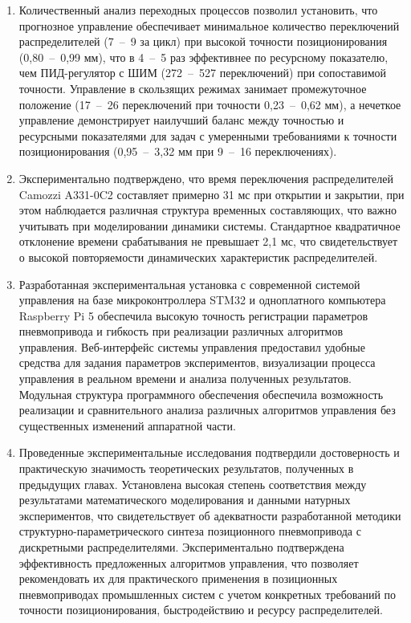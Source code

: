 \begin{enumerate}
\item Количественный анализ переходных процессов позволил установить, что прогнозное управление обеспечивает минимальное
количество переключений распределителей (7~--~9 за цикл) при высокой точности позиционирования (0,80~--~0,99 мм), что в 4~--~5 раз эффективнее
по ресурсному показателю, чем ПИД-регулятор с ШИМ (272~--~527 переключений) при сопоставимой точности. Управление в скользящих
режимах занимает промежуточное положение (17~--~26 переключений при точности 0,23~--~0,62 мм), а нечеткое управление демонстрирует
наилучший баланс между точностью и ресурсными показателями для задач с умеренными требованиями к точности позиционирования (0,95~--~3,32 мм при 9~--~16 переключениях).

\item Экспериментально подтверждено, что время переключения распределителей Camozzi A331-0C2 составляет примерно 31
мс при открытии и закрытии, при этом наблюдается различная структура временных составляющих, что важно учитывать
при моделировании динамики системы. Стандартное квадратичное отклонение времени срабатывания не превышает 2,1 мс,
что свидетельствует о высокой повторяемости динамических характеристик распределителей.

\item Разработанная экспериментальная установка с современной системой управления на базе микроконтроллера STM32 и
одноплатного компьютера Raspberry Pi 5 обеспечила высокую точность регистрации параметров пневмопривода и гибкость
при реализации различных алгоритмов управления. Веб-интерфейс системы управления предоставил удобные средства для задания
параметров экспериментов, визуализации процесса управления в реальном времени и анализа полученных результатов. Модульная
структура программного обеспечения обеспечила возможность реализации и сравнительного анализа различных алгоритмов
управления без существенных изменений аппаратной части.

\item Проведенные экспериментальные исследования подтвердили достоверность и практическую значимость теоретических результатов,
полученных в предыдущих главах. Установлена высокая степень соответствия между результатами математического моделирования
и данными натурных экспериментов, что свидетельствует об адекватности разработанной методики структурно-параметрического
синтеза позиционного пневмопривода с дискретными распределителями. Экспериментально подтверждена эффективность предложенных
алгоритмов управления, что позволяет рекомендовать их для практического применения в позиционных пневмоприводах промышленных
систем с учетом конкретных требований по точности позиционирования, быстродействию и ресурсу распределителей.
\end{enumerate}
